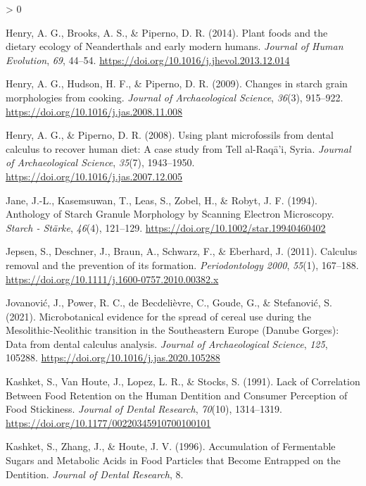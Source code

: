 \documentclass[
]{article}
\newlength{\cslhangindent}
\newenvironment{CSLReferences}[2] %
 {%
  \setlength{\parindent}{0pt}
  \ifodd #1 \everypar{\setlength{\hangindent}{\cslhangindent}}\ignorespaces\fi
  \ifnum #2 > 0
  \setlength{\parskip}{#2\baselineskip}
  \fi
 }%
 {}
\begin{document}
\begin{CSLReferences}{1}{0}
\leavevmode\hypertarget{ref-henryNeanderthalCalculus2014}{}%
Henry, A. G., Brooks, A. S., \& Piperno, D. R. (2014). Plant foods and the dietary ecology of {Neanderthals} and early modern humans. \emph{Journal of Human Evolution}, \emph{69}, 44--54. \url{https://doi.org/10.1016/j.jhevol.2013.12.014}

\leavevmode\hypertarget{ref-henryCookingStarch2009}{}%
Henry, A. G., Hudson, H. F., \& Piperno, D. R. (2009). Changes in starch grain morphologies from cooking. \emph{Journal of Archaeological Science}, \emph{36}(3), 915--922. \url{https://doi.org/10.1016/j.jas.2008.11.008}

\leavevmode\hypertarget{ref-henryCalculusSyria2008}{}%
Henry, A. G., \& Piperno, D. R. (2008). Using plant microfossils from dental calculus to recover human diet: A case study from {Tell} al-{Raqā}'i, {Syria}. \emph{Journal of Archaeological Science}, \emph{35}(7), 1943--1950. \url{https://doi.org/10.1016/j.jas.2007.12.005}

\leavevmode\hypertarget{ref-janeAnthologyStarch1994}{}%
Jane, J.-L., Kasemsuwan, T., Leas, S., Zobel, H., \& Robyt, J. F. (1994). Anthology of {Starch Granule Morphology} by {Scanning Electron Microscopy}. \emph{Starch - Stärke}, \emph{46}(4), 121--129. \url{https://doi.org/10.1002/star.19940460402}

\leavevmode\hypertarget{ref-jepsenCalculusRemoval2011}{}%
Jepsen, S., Deschner, J., Braun, A., Schwarz, F., \& Eberhard, J. (2011). Calculus removal and the prevention of its formation. \emph{Periodontology 2000}, \emph{55}(1), 167--188. \url{https://doi.org/10.1111/j.1600-0757.2010.00382.x}

\leavevmode\hypertarget{ref-jovanovicNeolithicCalculus2021}{}%
Jovanović, J., Power, R. C., de Becdelièvre, C., Goude, G., \& Stefanović, S. (2021). Microbotanical evidence for the spread of cereal use during the {Mesolithic}-{Neolithic} transition in the {Southeastern Europe} ({Danube Gorges}): Data from dental calculus analysis. \emph{Journal of Archaeological Science}, \emph{125}, 105288. \url{https://doi.org/10.1016/j.jas.2020.105288}

\leavevmode\hypertarget{ref-kashketFoodRetention1991}{}%
Kashket, S., Van Houte, J., Lopez, L. R., \& Stocks, S. (1991). Lack of {Correlation Between Food Retention} on the {Human Dentition} and {Consumer Perception} of {Food Stickiness}. \emph{Journal of Dental Research}, \emph{70}(10), 1314--1319. \url{https://doi.org/10.1177/00220345910700100101}

\leavevmode\hypertarget{ref-kashketFoodParticles1996}{}%
Kashket, S., Zhang, J., \& Houte, J. V. (1996). Accumulation of {Fermentable Sugars} and {Metabolic Acids} in {Food Particles} that {Become Entrapped} on the {Dentition}. \emph{Journal of Dental Research}, 8.


\end{CSLReferences}
\end{document}
